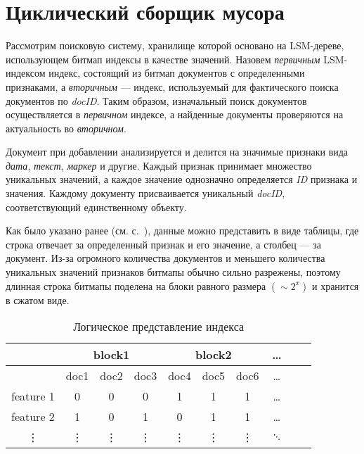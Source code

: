 \newpage
\section{Циклический сборщик мусора}
\label{section:dangling}

Рассмотрим поисковую систему, хранилище которой основано на LSM-дереве,
использующем битмап индексы в качестве значений. Назовем \textit{первичным}
LSM-индексом индекс, состоящий из битмап документов с определенными признаками,
а \textit{вторичным} — индекс, используемый для фактического поиска документов
по \textit{docID}. Таким образом, изначальный поиск документов осуществляется в
\textit{первичном} индексе, а найденные документы проверяются на актуальность
во \textit{вторичном}.

Документ при добавлении анализируется и делится на значимые признаки вида
\textit{дата}, \textit{текст}, \textit{маркер} и другие. Каждый признак
принимает множество уникальных значений, а каждое значение однозначно определяется
\textit{ID} признака и значения. Каждому документу присваивается уникальный
\textit{docID}, соответствующий единственному объекту.

Как было указано ранее (см. с.~\pageref{table}), данные можно представить в виде
таблицы, где строка отвечает за определенный признак и его значение, а столбец
— за документ. Из-за огромного количества документов и меньшего количества
уникальных значений признаков битмапы обычно сильно разрежены, поэтому длинная
строка битмапы поделена на блоки равного размера $(\sim 2^{x})$ и хранится в
сжатом виде.

\begin{table}[H]
\caption{Логическое представление индекса}
\centering
\small
\singlespacing
\begin{tabular}{|c|c|c|c|c|c|c|c|c|c|}
    \hline
                &\multicolumn{3}{c|}{block1}&\multicolumn{3}{c|}{block2}& \ldots \\ \hline
                & doc1  & doc2  & doc3      & doc4  & doc5      & doc6  & \ldots \\ \hline
    feature 1   & 0     & 0     & 0         & 1     & 1         & 1     & \ldots \\ \hline
    feature 2   & 1     & 0     & 1         & 0     & 1         & 1     & \ldots \\ \hline
    \vdots      & \vdots& \vdots& \vdots    & \vdots& \vdots    &\vdots & $\ddots$ \\ \hline
\end{tabular}
\label{index}
\end{table}

